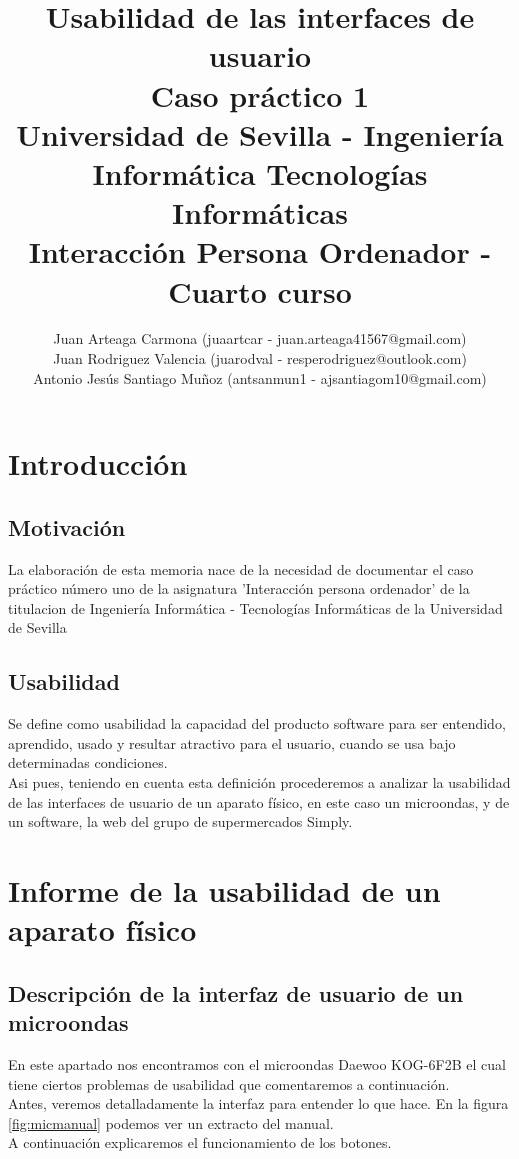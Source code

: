 \documentclass[a4paper,11pt]{article}
\title{
        \textbf{Usabilidad de las interfaces de usuario}\large\\
        \textbf{Caso práctico 1}\\
        \medskip
        Universidad de Sevilla - Ingeniería Informática Tecnologías Informáticas\\
        Interacción Persona Ordenador - Cuarto curso}
\author{Juan Arteaga Carmona (juaartcar - juan.arteaga41567@gmail.com)\\
        Juan Rodriguez Valencia (juarodval - resperodriguez@outlook.com)\\
        Antonio Jesús Santiago Muñoz (antsanmun1 - ajsantiagom10@gmail.com)\\
}
\begin{document}
\maketitle

\newpage
\tableofcontents
\listoffigures
\newpage

\section{Introducción}
\subsection{Motivación}
La elaboración de esta memoria nace de la necesidad de documentar el caso práctico número uno de la asignatura 'Interacción persona ordenador' de la titulacion de Ingeniería Informática - Tecnologías Informáticas de la Universidad de Sevilla
\subsection{Usabilidad}
Se define como usabilidad la capacidad del producto software para ser entendido, aprendido, usado y resultar atractivo para el usuario, cuando se usa bajo determinadas condiciones. \cite{diapTema1} \cite{iso25010}\\
Asi pues, teniendo en cuenta esta definición procederemos a analizar la usabilidad de las interfaces de usuario de un aparato físico, en este caso un microondas, y de un software, la web del grupo de supermercados Simply.


\section{Informe de la usabilidad de un aparato físico}
\subsection{Descripción de la interfaz de usuario de un microondas}
En este apartado nos encontramos con el microondas Daewoo KOG-6F2B el cual tiene ciertos problemas de usabilidad que comentaremos a continuación.\\
Antes, veremos detalladamente la interfaz para entender lo que hace.
En la figura \ref{fig:micmanual} podemos ver un extracto del manual. \cite{manualmic}\\
A continuación explicaremos el funcionamiento de los botones.
\end{document}
